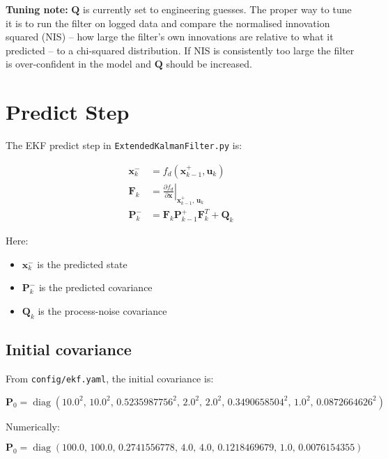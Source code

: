 \documentclass[11pt]{article}
\newcommand{\vect}[1]{\boldsymbol{#1}}
\newcommand{\mat}[1]{\mathbf{#1}}
\newcommand{\diag}{\operatorname{diag}}
\begin{document}
\textbf{Tuning note:} $\mat{Q}$ is currently set to engineering guesses.
The proper way to tune it is to run the filter on logged data and compare the
normalised innovation squared (NIS) -- how large the filter's own innovations
are relative to what it predicted -- to a chi-squared distribution.  If NIS is
consistently too large the filter is over-confident in the model and $\mat{Q}$
should be increased.

\section{Predict Step}

The EKF predict step in \texttt{ExtendedKalmanFilter.py} is:

\begin{align}
\vect{x}_k^- &= f_d(\vect{x}_{k-1}^+, \vect{u}_k) \\
\mat{F}_k &= \left.\frac{\partial f_d}{\partial \vect{x}}\right|_{\vect{x}_{k-1}^+,\,\vect{u}_k} \\
\mat{P}_k^- &= \mat{F}_k \mat{P}_{k-1}^+ \mat{F}_k^T + \mat{Q}_k
\end{align}

Here:

\begin{itemize}
    \item $\vect{x}_k^-$ is the predicted state
    \item $\mat{P}_k^-$ is the predicted covariance
    \item $\mat{Q}_k$ is the process-noise covariance
\end{itemize}

\subsection{Initial covariance}

From \texttt{config/ekf.yaml}, the initial covariance is:

\begin{equation}
\mat{P}_0 = \diag(
10.0^2,\,
10.0^2,\,
0.5235987756^2,\,
2.0^2,\,
2.0^2,\,
0.3490658504^2,\,
1.0^2,\,
0.0872664626^2)
\end{equation}

Numerically:

\begin{equation}
\mat{P}_0 = \diag(
100.0,\,
100.0,\,
0.2741556778,\,
4.0,\,
4.0,\,
0.1218469679,\,
1.0,\,
0.0076154355)
\end{equation}
\end{document}
